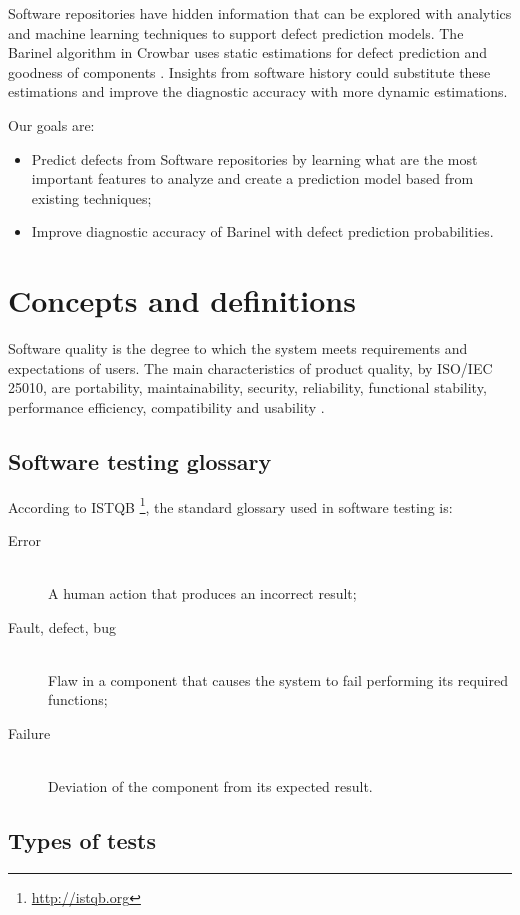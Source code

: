 Software repositories have hidden information that can be explored with
analytics and machine learning techniques to support defect prediction
models. The Barinel algorithm in Crowbar uses static estimations for
defect prediction and goodness of components
\cite{Abreu:2009:SMF:1747491.1747511}. Insights from software history could
substitute these estimations and improve the diagnostic accuracy with more
dynamic estimations.

Our goals are:

\begin{itemize}
\item Predict defects from Software repositories by learning what are the most
important features to analyze and create a prediction model based from existing
techniques;
\item Improve diagnostic accuracy of Barinel with defect prediction
 probabilities.
\end{itemize}

\section{Concepts and definitions} \label{sec:concepts}
Software quality is the degree to which the system meets requirements and
expectations of users. The main characteristics of product quality,
by ISO/IEC 25010, are portability, maintainability, security, reliability,
functional stability, performance efficiency, compatibility and
usability \cite{isoiec25010:2011}.

\subsection{Software testing glossary}
According to ISTQB \footnote{\url{http://istqb.org}}, the standard glossary
 used in software testing is:
\begin{description}
  \item[Error] \hfill \\
   A human action that produces an incorrect result;
  \item[Fault, defect, bug] \hfill \\
  Flaw in a component that causes the system to fail performing its required
   functions;
  \item[Failure] \hfill \\
  Deviation of the component from its expected result.
\end{description}

\subsection{Types of tests}

